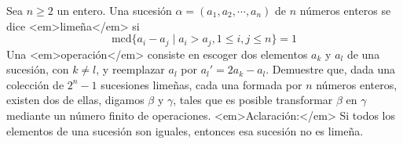 Sea $n \geq 2$ un entero. Una sucesión $\alpha = (a_1, a_2, \cdots , a_n)$ de $n$ números enteros se dice <em>limeña</em> si
\[ \textrm{mcd}\{ a_i - a_j \mid a_i > a_j, 1 \leq i,j \leq n \} = 1 \]
Una <em>operación</em> consiste en escoger dos elementos $a_k$ y $a_l$ de una sucesión, con $k \neq l$, y reemplazar $a_l$ por $a_l' = 2a_k - a_l$. \newline 
Demuestre que, dada una colección de $2^n-1$ sucesiones limeñas, cada una formada por $n$ números enteros, existen dos de ellas, digamos $\beta$ y $\gamma$, tales que es posible transformar $\beta$ en $\gamma$ mediante un número finito de operaciones. \newline 
<em>Aclaración:</em> Si todos los elementos de una sucesión son iguales, entonces esa sucesión no es limeña.

